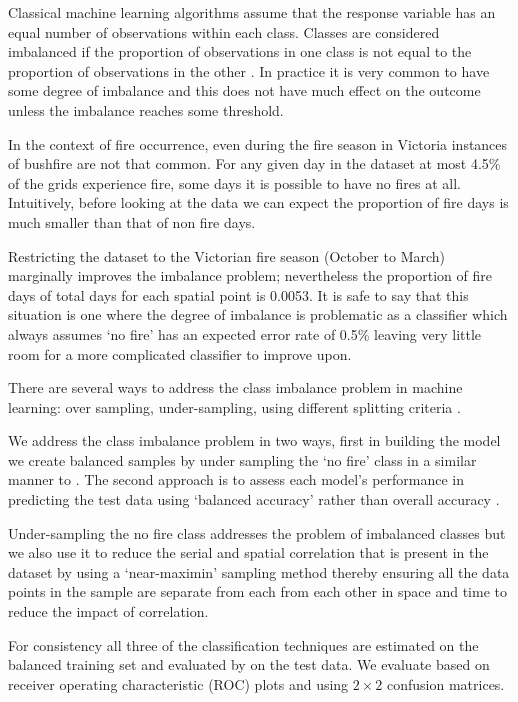 \documentclass[11pt,a4paper]{article}
\begin{document}
Classical machine learning algorithms assume that the response variable has an equal number of observations within each class. Classes are considered imbalanced if the proportion of observations in one class is not equal to the proportion of observations in the other \citep{japkowicz00}. In practice it is very common to have some degree of imbalance and this does not have much effect on the outcome unless the imbalance reaches some threshold.

In the context of fire occurrence, even during the fire season in Victoria instances of bushfire are not that common. For any given day in the dataset at most 4.5\% of the grids experience fire, some days it is possible to have no fires at all. Intuitively, before looking at the data we can expect the proportion of fire days is much smaller than that of non fire days.

Restricting the dataset to the Victorian fire season (October to March) marginally improves the imbalance problem; nevertheless the proportion of fire days of total days for each spatial point is 0.0053. It is safe to say that this situation is one where the degree of imbalance is problematic as a classifier which always assumes `no fire' has an expected error rate of 0.5\% leaving very little room for a more complicated classifier to improve upon.

There are several ways to address the class imbalance problem in machine learning: over sampling, under-sampling, using different splitting criteria \citep{japkowicz00}.

We address the class imbalance problem in two ways, first in building the model we create balanced samples by under sampling the `no fire' class in a similar manner to \citep{padilla11}.  The second approach is to assess each model's performance in predicting the test data using `balanced accuracy' rather than overall accuracy \citep{mosley13, japkowicz00}.

Under-sampling the no fire class addresses the problem of imbalanced classes but we also use it to reduce the serial and spatial correlation that is present in the dataset by using a `near-maximin' sampling method thereby ensuring all the data points in the sample are separate from each from each other in space and time to reduce the impact of correlation.

For consistency all three of the classification techniques are estimated on the balanced training set and evaluated by  on the test data. We evaluate based on receiver operating characteristic (ROC) plots  and using $2\times2$ confusion matrices.
\end{document}
